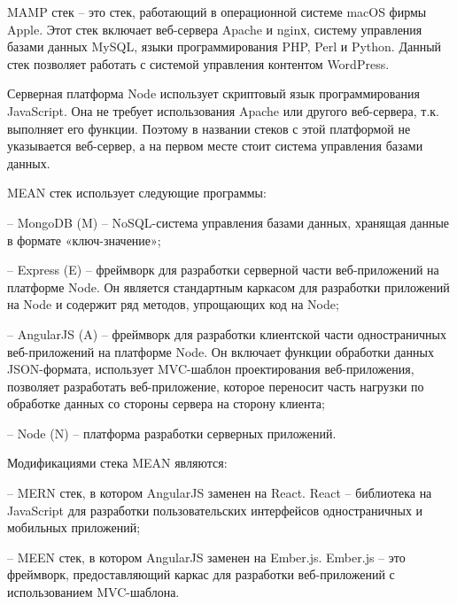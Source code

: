 
MAMP стек – это стек, работающий в операционной системе macOS фирмы Apple.
Этот стек включает веб-сервера Apache и nginх, систему управления базами данных MySQL, языки программирования PHP, Perl и Python.
Данный стек позволяет работать с системой управления контентом WordPress.

Серверная платформа Node \cite{davidovsky-vibor-NODE} использует скриптовый язык программирования JavaScript.
Она не требует использования Apache или другого веб-сервера, т.к. выполняет его функции.
Поэтому в названии стеков с этой платформой не указывается веб-сервер, а на первом месте стоит система управления базами данных.


MEAN стек \cite{davidovsky-vibor-mean} использует следующие программы:

-- MongoDB (M) -- NoSQL-система управления базами данных, хранящая данные в формате
«ключ-значение»;

-- Express (E) -- фреймворк для разработки серверной части веб-приложений на платформе Node. Он является стандартным каркасом для разработки приложений на Node и содержит ряд методов, упрощающих код на Node;

-- AngularJS (A) -- фреймворк для разработки клиентской части одностраничных веб-приложений на платформе Node.
Он включает функции обработки данных JSON-формата, использует MVC-шаблон проектирования веб-приложения, позволяет разработать веб-приложение, которое переносит часть нагрузки по обработке данных со стороны сервера на сторону клиента;

-- Node (N) -- платформа разработки серверных приложений.

Модификациями стека MEAN являются:

-- MERN стек, в котором AngularJS заменен на React.
React -- библиотека на JavaScript для разработки пользовательских интерфейсов одностраничных и мобильных приложений;

-- MEEN стек, в котором AngularJS заменен на Ember.js.
Ember.js -- это фреймворк, предоставляющий каркас для разработки веб-приложений с использованием MVC-шаблона.
\clearpage
